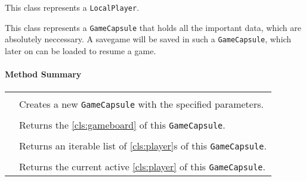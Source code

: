 \pagebreak

This class represents a \texttt{LocalPlayer}.

\pagebreak

This class represents a \texttt{GameCapsule} that holds all the important data, which are absolutely neccessary. A \gls{savegame} will be saved in such a \texttt{GameCapsule}, which later on can be loaded to resume a game.

\centerdash

\paragraph*{Method Summary}
\paragraph*{}
\begin{longtable}{Lp{10cm}}
	\startmethodtable
	 \\
	& Creates a new \texttt{GameCapsule} with the specified parameters. \\
	 \\
	& Returns the \ref{cls:gameboard} of this \texttt{GameCapsule}. \\
	 \\
	& Returns an iterable list of \ref{cls:player}s of this \texttt{GameCapsule}. \\
	 \\
	& Returns the current active \ref{cls:player} of this \texttt{GameCapsule}. \\
	\hline
\end{longtable}